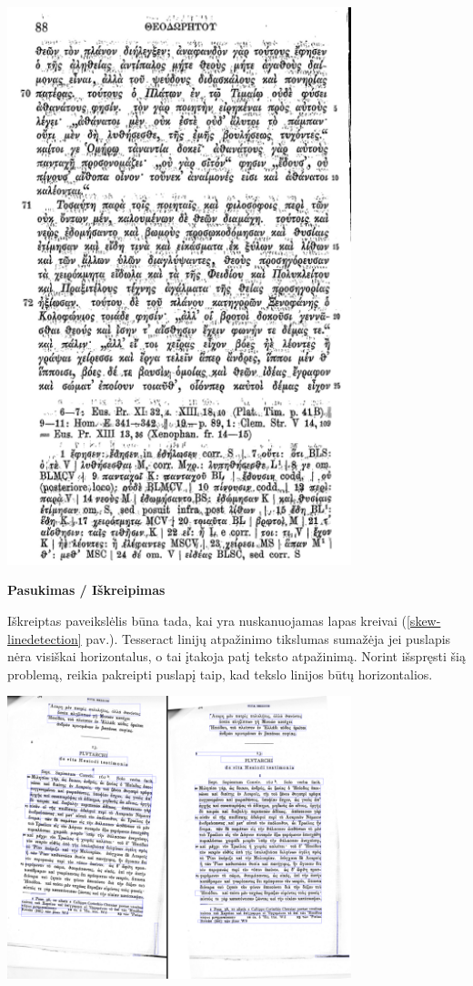 \documentclass{VUMIFInfBakalaurinis}
\begin{document}
\begin{minipage}{\linewidth}
  \centering
  \includegraphics[width=10cm]{noise.png}
  \label{noise}
\end{minipage}

\textbf{Pasukimas / Iškreipimas}

Iškreiptas paveikslėlis būna tada, kai yra nuskanuojamas lapas kreivai (\ref{skew-linedetection} pav.). Tesseract linijų atpažinimo tikslumas sumažėja jei puslapis nėra visiškai horizontalus, o
tai įtakoja patį teksto atpažinimą. Norint išspręsti šią problemą, reikia pakreipti puslapį taip, kad tekslo linijos būtų horizontalios.

\begin{minipage}{\linewidth}
  \centering
  \includegraphics[width=10cm]{skew-linedetection.png}
  \label{skew-linedetection}
\end{minipage}
\end{document}
